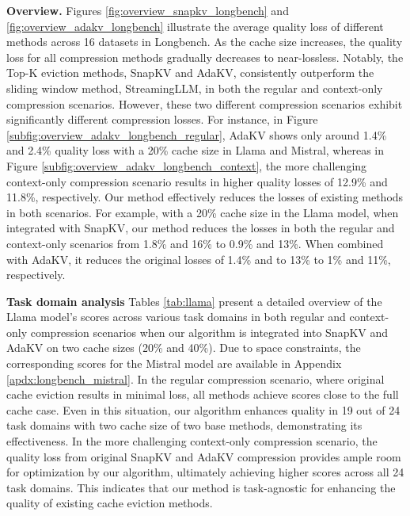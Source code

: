 \textbf{Overview.}
Figures \ref{fig:overview_snapkv_longbench} and \ref{fig:overview_adakv_longbench} illustrate the average quality loss of different methods across 16 datasets in Longbench. As the cache size increases, the quality loss for all compression methods gradually decreases to near-lossless. Notably, the Top-K eviction methods, SnapKV and AdaKV, consistently outperform the sliding window method, StreamingLLM, in both the regular and context-only compression scenarios. However, these two different compression scenarios exhibit significantly different compression losses. For instance, in Figure \ref{subfig:overview_adakv_longbench_regular}, AdaKV shows only around 1.4\% and 2.4\% quality loss with a 20\% cache size in Llama and Mistral, whereas in Figure \ref{subfig:overview_adakv_longbench_context}, the more challenging context-only compression scenario results in higher quality losses of 12.9\% and 11.8\%, respectively.
Our method effectively reduces the losses of existing methods in both scenarios. For example, with a 20\% cache size in the Llama model, when integrated with SnapKV, our method reduces the losses in both the regular and context-only scenarios from 1.8\% and 16\% to 0.9\% and 13\%. When combined with AdaKV, it reduces the original losses of 1.4\% and to 13\% to 1\% and 11\%, respectively.


\textbf{Task domain analysis}
Tables \ref{tab:llama} present a detailed overview of the Llama model's scores across various task domains in both regular and context-only compression scenarios when our algorithm is integrated into SnapKV and AdaKV on two cache sizes (20\% and 40\%). Due to space constraints, the corresponding scores for the Mistral model are available in Appendix \ref{apdx:longbench_mistral}.
In the regular compression scenario, where original cache eviction results in minimal loss, all methods achieve scores close to the full cache case. Even in this situation, our algorithm enhances quality in 19 out of 24 task domains with two cache size of two base methods, demonstrating its effectiveness. In the more challenging context-only compression scenario, the quality loss from original SnapKV and AdaKV compression provides ample room for optimization by our algorithm, ultimately achieving higher scores across all 24 task domains. This indicates that our method is task-agnostic for enhancing the quality of existing cache eviction methods.




